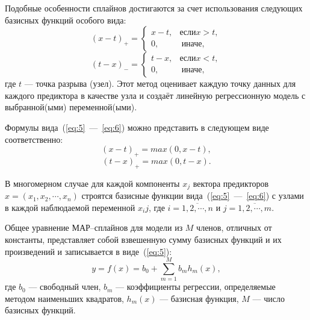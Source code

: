 Подобные особенности сплайнов достигаются за счет использования следующих базисных функций особого вида:
\begin{equation}
    (x - t)_{+} = \begin{cases}
        x - t, & если x > t, \\
        0, &~\text{иначе},
    \end{cases}
    \label{eq:5}
\end{equation}
\begin{equation}
    (t - x)_{-} = \begin{cases}
        t - x, & если x < t, \\
        0, &~\text{иначе},
    \end{cases}
    \label{eq:6}
\end{equation}
где $t$ --- точка разрыва (узел).
Этот метод оценивает каждую точку данных для каждого предиктора в качестве узла и создаёт линейную регрессионную модель с выбранной(ыми) переменной(ыми).

Формулы вида~(\ref{eq:5}~---~\ref{eq:6}) можно представить в следующем виде соответственно:
\begin{equation}
    (x - t)_{+} = max(0, x - t),
\end{equation}
\begin{equation}
    (t - x)_{+} = max(0, t - x).
\end{equation}

В многомерном случае для каждой компоненты $x_j$ вектора предикторов $x = (x_1, x_2, \cdots, x_n)$ строятся базисные функции вида~(\ref{eq:5}~---~\ref{eq:6}) с узлами в каждой наблюдаемой переменной $x_ij$, где $i = \overline{1, 2, \cdots, n}$ и $j = \overline{1, 2, \cdots, m}$.

Общее уравнение МАР--сплайнов для модели из $M$ членов, отличных от константы, представляет собой взвешенную сумму базисных функций и их произведений и записывается в виде~(\ref{eq:5}):
\begin{equation}
    y = f(x) = b_0 + \sum_{m=1}^{M} b_m h_m(x),
\end{equation}
где $b_0$ --- свободный член, $b_m$ --- коэффициенты регрессии, определяемые методом наименьших квадратов, $h_m(x)$ --- базисная функция, $M$ --- число базисных функций.

